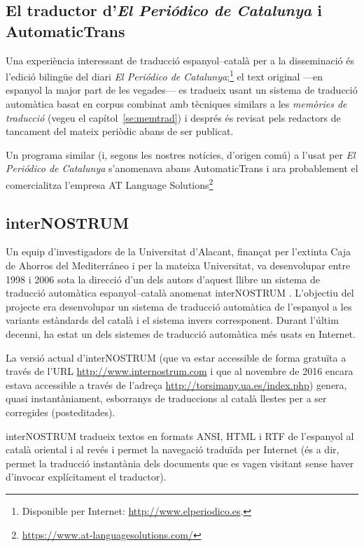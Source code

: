 \subsection{El traductor d'\emph{El Periódico de Catalunya} i AutomaticTrans}
\label{ss:ePdC}

Una experiència interessant \citep{fiteperiodico} de traducció
espanyol--català per a la disseminació és l'edició bilingüe del diari
\emph{El Periódico de Catalunya};\footnote{Disponible per Internet:
  \url{http://www.elperiodico.es}.} el text original ---en espanyol
la major part de les vegades--- es tradueix usant un sistema de
traducció automàtica basat en corpus combinat amb tècniques similars a
les \emph{memòries de traducció} (vegeu el capítol~\ref{se:memtrad}) i
després és revisat pels redactors de tancament del mateix periòdic
abans de ser publicat.

Un programa similar (i, segons les nostres notícies, d'origen comú) a
l'usat per \emph{El Periódico de Catalunya} s'anomenava abans
AutomaticTrans i ara probablement el comercialitza l'empresa AT
Language
Solutions\footnote{\url{https://www.at-languagesolutions.com/}}


\subsection{interNOSTRUM}

Un equip d'investigadors de la Universitat d'Alacant, finançat per
l'extinta Caja de Ahorros del Mediterráneo i per la mateixa
Universitat, va desenvolupar entre 1998 i 2006 sota la direcció d'un
dels autors d'aquest llibre un sistema de traducció automàtica
espanyol--català anomenat \textsf{interNOSTRUM}
\citep{canals01a,canals01b}. L'objectiu del projecte era desenvolupar
un sistema de traducció automàtica de l'espanyol a les variants
estàndards del català i el sistema invers corresponent. Durant l'últim decenni, ha estat un dels sistemes de traducció automàtica més usats en Internet.

La versió actual d'{\sf interNOSTRUM} (que va estar accessible de forma
gratuïta a través de l'URL \url{http://www.internostrum.com} i que al
novembre de 2016 encara estava accessible a través de l'adreça
\url{http://torsimany.ua.es/index.php}) genera, quasi instantàniament,
esborranys de traduccions al català llestes per a ser corregides
(posteditades). 

{\sf interNOSTRUM} tradueix textos en formats ANSI, HTML i RTF de
l'espanyol al català oriental i al revés i permet la navegació
traduïda per Internet (és a dir, permet la traducció instantània dels
documents que es vagen visitant sense haver d'invocar explícitament el
traductor).  

